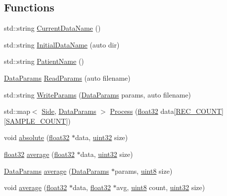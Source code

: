 \subsection*{Functions}
\begin{DoxyCompactItemize}
\item 
std\+::string \hyperlink{namespacevaso_abab641a332f2e834dfcdf294c0429426}{Current\+Data\+Name} ()
\item 
std\+::string \hyperlink{namespacevaso_af8f45524d4770053c2b812ce33a7095f}{Initial\+Data\+Name} (auto dir)
\item 
std\+::string \hyperlink{namespacevaso_a21e264fa912f7ca3f50e7e412ba1582e}{Patient\+Name} ()
\item 
\hyperlink{structDataParams}{Data\+Params} \hyperlink{namespacevaso_a6f1a23c617aae2e2c4af5e8016b4d03e}{Read\+Params} (auto filename)
\item 
std\+::string \hyperlink{namespacevaso_ad8543c0caabf3836b4a93a78e0d487d1}{Write\+Params} (\hyperlink{structDataParams}{Data\+Params} params, auto filename)
\item 
std\+::map$<$ \hyperlink{namespacevaso_a77c5d9704657d49d456f691ddd8abf7c}{Side}, \hyperlink{structDataParams}{Data\+Params} $>$ \hyperlink{namespacevaso_a852067e19b0bcfebb4fa6674c7c8d67f}{Process} (\hyperlink{definitions_8hpp_aacdc525d6f7bddb3ae95d5c311bd06a1}{float32} data\mbox{[}\hyperlink{definitions_8hpp_aa44e6143be9e89f19be973956c22e134}{R\+E\+C\+\_\+\+C\+O\+U\+N\+T}\mbox{]}\mbox{[}\hyperlink{definitions_8hpp_a1682c770d91c5d167b621a782be940d4}{S\+A\+M\+P\+L\+E\+\_\+\+C\+O\+U\+N\+T}\mbox{]})
\item 
void \hyperlink{namespacevaso_a6ca90add966ce1773fc59a6883e6cd0c}{absolute} (\hyperlink{definitions_8hpp_aacdc525d6f7bddb3ae95d5c311bd06a1}{float32} $\ast$data, \hyperlink{definitions_8hpp_a1134b580f8da4de94ca6b1de4d37975e}{uint32} size)
\item 
\hyperlink{definitions_8hpp_aacdc525d6f7bddb3ae95d5c311bd06a1}{float32} \hyperlink{namespacevaso_ad3205136b1cd04b4c6b9d7be73661796}{average} (\hyperlink{definitions_8hpp_aacdc525d6f7bddb3ae95d5c311bd06a1}{float32} $\ast$data, \hyperlink{definitions_8hpp_a1134b580f8da4de94ca6b1de4d37975e}{uint32} size)
\item 
\hyperlink{structDataParams}{Data\+Params} \hyperlink{namespacevaso_a376413e791defec04a0faf329be1cbf4}{average} (\hyperlink{structDataParams}{Data\+Params} $\ast$params, \hyperlink{definitions_8hpp_adde6aaee8457bee49c2a92621fe22b79}{uint8} size)
\item 
void \hyperlink{namespacevaso_a9d0e5d69685ee494d286db6ece005156}{average} (\hyperlink{definitions_8hpp_aacdc525d6f7bddb3ae95d5c311bd06a1}{float32} $\ast$data, \hyperlink{definitions_8hpp_aacdc525d6f7bddb3ae95d5c311bd06a1}{float32} $\ast$avg, \hyperlink{definitions_8hpp_adde6aaee8457bee49c2a92621fe22b79}{uint8} count, \hyperlink{definitions_8hpp_a1134b580f8da4de94ca6b1de4d37975e}{uint32} size)

\end{DoxyCompactItemize}
